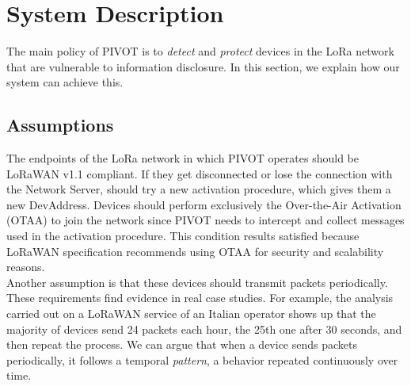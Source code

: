 \newpage

\section{System Description}
\label{system}
The main policy of PIVOT is to \textit{detect} and \textit{protect} devices in the LoRa network that are vulnerable to information disclosure. In this section, we explain how our system can achieve this.
\vspace{5mm}

\subsection{Assumptions}
The endpoints of the LoRa network in which PIVOT operates should be LoRaWAN v1.1 compliant. If they get disconnected or lose the connection with the Network Server, should try a new activation procedure, which gives them a new DevAddress. Devices should perform exclusively the Over-the-Air Activation (OTAA) to join the network since PIVOT needs to intercept and collect \jr messages used in the activation procedure. This condition results satisfied because LoRaWAN specification recommends using OTAA for security and scalability reasons. 
\\
Another assumption is that these devices should transmit packets periodically. These requirements find evidence in real case studies. For example, the analysis carried out on a LoRaWAN service of an Italian operator \cite{devil} shows up that the majority of devices send 24 packets each hour, the 25th one after 30 seconds, and then repeat the process. We can argue that when a device sends packets periodically, it follows a temporal \textit{pattern}, a behavior repeated continuously over time.
\vspace{5mm}

